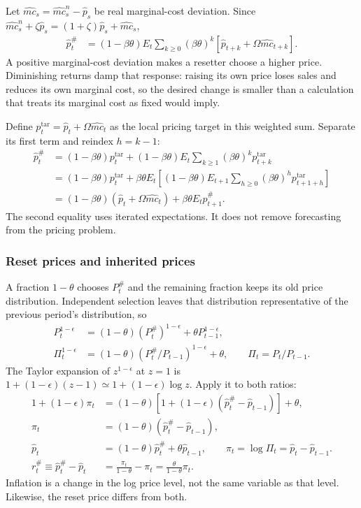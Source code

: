 Let $\hat{mc}_s=\hat{mc}_s^n-\hat p_s$ be real marginal-cost deviation.
Since $\hat{mc}_s^n+\zeta\hat p_s=(1+\zeta)\hat p_s+\hat{mc}_s$,
\begin{align}
 \hat p_t^{\#}&=(1-\beta\theta)E_t\sum_{k\geq0}(\beta\theta)^k
                     [\hat p_{t+k}+\Omega\hat{mc}_{t+k}].
 \label{eq:nk-reset-linear}
\end{align}
A positive marginal-cost deviation makes a resetter choose a higher price.
Diminishing returns damp that response: raising its own price loses sales and
reduces its own marginal cost, so the desired change is smaller than a
calculation that treats its marginal cost as fixed would imply.

Define $p_t^{\mathrm{tar}}=\hat p_t+\Omega\hat{mc}_t$ as the local pricing
target in this weighted sum. Separate its first term and reindex $h=k-1$:
\begin{align}
 \hat p_t^{\#}
 &=(1-\beta\theta)p_t^{\mathrm{tar}}
  +(1-\beta\theta)E_t\sum_{k\geq1}(\beta\theta)^k p_{t+k}^{\mathrm{tar}}\\
 &=(1-\beta\theta)p_t^{\mathrm{tar}}
  +\beta\theta E_t\left[(1-\beta\theta)
       E_{t+1}\sum_{h\geq0}(\beta\theta)^h p_{t+1+h}^{\mathrm{tar}}\right]\\
 &=(1-\beta\theta)(\hat p_t+\Omega\hat{mc}_t)
                      +\beta\theta E_t\hat p_{t+1}^{\#}.
 \label{eq:nk-reset-recursion}
\end{align}
The second equality uses iterated expectations. It does not remove forecasting
from the pricing problem.

\subsubsection{Reset prices and inherited prices}

A fraction $1-\theta$ chooses $P_t^{\#}$ and the remaining fraction keeps its
old price distribution. Independent selection leaves that distribution
representative of the previous period's distribution, so
\begin{align}
 P_t^{1-\epsilon}
 &=(1-\theta)(P_t^{\#})^{1-\epsilon}+\theta P_{t-1}^{1-\epsilon},\\
 \Pi_t^{1-\epsilon}
 &=(1-\theta)(P_t^{\#}/P_{t-1})^{1-\epsilon}+\theta,
 \qquad\Pi_t=P_t/P_{t-1}.
\end{align}
The Taylor expansion of $z^{1-\epsilon}$ at $z=1$ is
$1+(1-\epsilon)(z-1)\simeq1+(1-\epsilon)\log z$.
Apply it to both ratios:
\begin{align}
 1+(1-\epsilon)\pi_t
 &=(1-\theta)[1+(1-\epsilon)(\hat p_t^{\#}-\hat p_{t-1})]+\theta,\\
 \pi_t&=(1-\theta)(\hat p_t^{\#}-\hat p_{t-1}),\\
 \hat p_t&=(1-\theta)\hat p_t^{\#}+\theta\hat p_{t-1},
 \qquad\pi_t=\log\Pi_t=\hat p_t-\hat p_{t-1}.
 \label{eq:nk-price-aggregation}\\
 r_t^{\#}\equiv\hat p_t^{\#}-\hat p_t
 &=\frac{\pi_t}{1-\theta}-\pi_t
 =\frac\theta{1-\theta}\pi_t.
\end{align}
Inflation is a change in the log price level, not the same variable as that
level. Likewise, the reset price differs from both.

